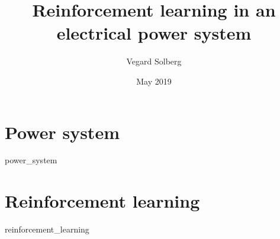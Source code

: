 \documentclass{book}
\title{Reinforcement learning in an electrical power system}
\author{Vegard Solberg}
\date{May 2019}
\begin{document}
 
    \maketitle
    \tableofcontents
 
    \chapter{Power system}
    {power_system}
 
    \chapter{Reinforcement learning}
    {reinforcement_learning}
    
    \printbibliography
 
\end{document}
